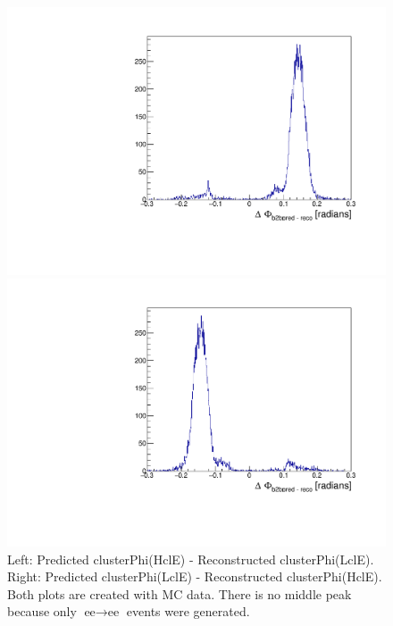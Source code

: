 \documentclass[a4paper,11pt,twosided,final,german,openbib,pdftex,listof=totoc,bibliography=totoc]{scrbook}
\begin{document}
\begin{appendix}
\begin{figure}[h!]
	\centering
	\begin{minipage}[b]{0.45\linewidth}
		\centering
		\includegraphics[width=\textwidth]{Cuts/b2bTP_mc.pdf}
	\end{minipage}
	\hspace{0.5cm}
	\begin{minipage}[b]{0.45\linewidth}
		\centering
		\includegraphics[width=\textwidth]{Cuts/b2bPT_mc.pdf}
	\end{minipage}
	\caption[b2bClusterPhi - clusterPhi For MC]{Left: Predicted clusterPhi(HclE) - Reconstructed clusterPhi(LclE). Right: Predicted clusterPhi(LclE) - Reconstructed clusterPhi(HclE). Both plots are created with MC data. There is no middle peak because only $\textrm{ee} \rightarrow \textrm{ee}$ events were generated.}
	\label{fig:b2bMC}
\end{figure}





\end{appendix}
\end{document}
